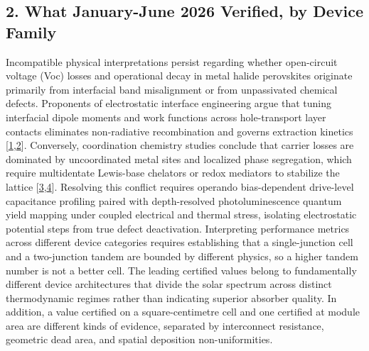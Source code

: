 \documentclass[
  11pt,
]{article}
\begin{document}
\subsection{2. What January-June 2026 Verified, by Device
Family}\label{what-january-june-2026-verified-by-device-family}

Incompatible physical interpretations persist regarding whether
open-circuit voltage (Voc) losses and operational decay in metal halide
perovskites originate primarily from interfacial band misalignment or
from unpassivated chemical defects. Proponents of electrostatic
interface engineering argue that tuning interfacial dipole moments and
work functions across hole-transport layer contacts eliminates
non-radiative recombination and governs extraction kinetics
{[}\href{https://doi.org/10.1002/adma.202523338}{1},\href{https://doi.org/10.1038/s41467-026-73426-0}{2}{]}.
Conversely, coordination chemistry studies conclude that carrier losses
are dominated by uncoordinated metal sites and localized phase
segregation, which require multidentate Lewis-base chelators or redox
mediators to stabilize the lattice
{[}\href{https://doi.org/10.1038/s41560-026-01993-z}{3},\href{https://doi.org/10.1126/science.aeb7992}{4}{]}.
Resolving this conflict requires operando bias-dependent drive-level
capacitance profiling paired with depth-resolved photoluminescence
quantum yield mapping under coupled electrical and thermal stress,
isolating electrostatic potential steps from true defect deactivation.
Interpreting performance metrics across different device categories
requires establishing that a single-junction cell and a two-junction
tandem are bounded by different physics, so a higher tandem number is
not a better cell. The leading certified values belong to fundamentally
different device architectures that divide the solar spectrum across
distinct thermodynamic regimes rather than indicating superior absorber
quality. In addition, a value certified on a square-centimetre cell and
one certified at module area are different kinds of evidence, separated
by interconnect resistance, geometric dead area, and spatial deposition
non-uniformities.
\end{document}
